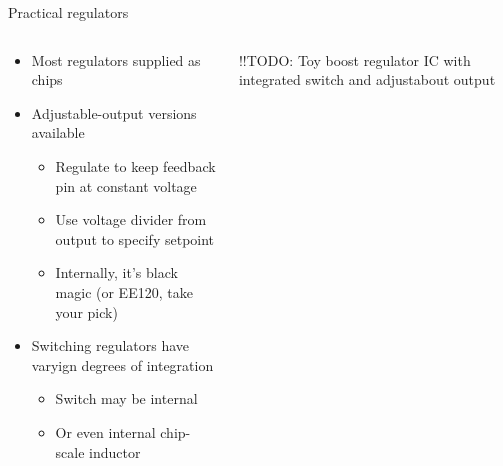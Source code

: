 \documentclass{beamer}
\begin{document}
\begin{frame}{Practical regulators}
  \begin{columns}[T]
    \begin{column}{.6\textwidth}
      \begin{itemize}
        \item Most regulators supplied as chips
        \item Adjustable-output versions available
        \begin{itemize}
          \item Regulate to keep feedback pin at constant voltage
          \item Use voltage divider from output to specify setpoint
          \item Internally, it's black magic (or EE120, take your pick)
        \end{itemize}
        \item Switching regulators have varyign degrees of integration
        \begin{itemize}
          \item Switch may be internal
          \item Or even internal chip-scale inductor
        \end{itemize}
      \end{itemize}
    \end{column}

    \begin{column}{0.4\textwidth}
      !!TODO: Toy boost regulator IC with integrated switch and adjustabout output
    \end{column}
  \end{columns}
\end{frame}
\end{document}
